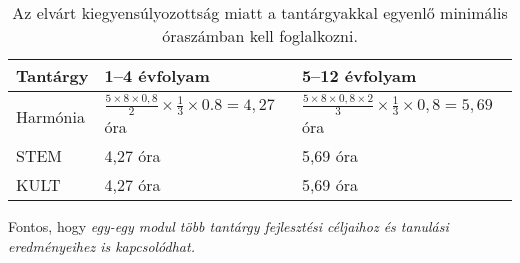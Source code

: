 \begin{table}

  \begin{tabular}{ l|l|l }

    \textbf{Tantárgy} & \textbf{1--4 évfolyam}                               & \textbf{5--12 évfolyam}
    \\ \hline
    Harmónia          & $\frac{5 \times 8 \times 0,8}{2} \times \frac{1}{3}
      \times 0.8 =
    4,27$ óra         &
    $\frac{5 \times 8 \times 0,8 \times 2}{3} \times \frac{1}{3} \times 0,8 =
      5,69$
    óra
    \\ \hline
    STEM              & 4,27 óra
                      & 5,69 óra                                                                     \\
    \hline
    KULT              & 4,27 óra
                      & 5,69 óra                                                                     \\
    \hline

  \end{tabular}
  \caption{Az elvárt kiegyensúlyozottság miatt a tantárgyakkal egyenlő
    minimális óraszámban kell foglalkozni.}
  \label{tbl:oraszamok}
\end{table}

Fontos, hogy \emph{egy-egy modul több tantárgy fejlesztési céljaihoz és
  tanulási eredményeihez is kapcsolódhat.}
